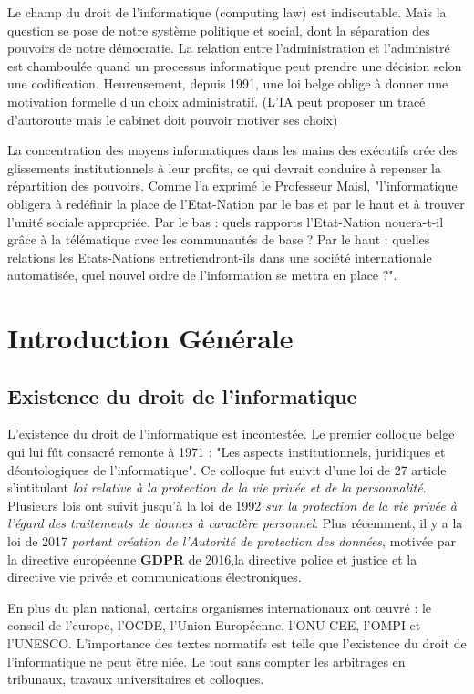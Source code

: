 \documentclass[fleqn,letterpaper, 12pt]{article}
\begin{document}
	Le champ du droit de l'informatique (computing law) est indiscutable. Mais la question se pose de notre système politique et social, dont la séparation des pouvoirs de notre démocratie. La relation entre l'administration et l'administré est chamboulée quand un processus informatique peut prendre une décision selon une codification. Heureusement, depuis 1991, une loi belge oblige à donner une motivation formelle d'un choix administratif. (L'IA peut proposer un tracé d'autoroute mais le cabinet doit pouvoir motiver ses choix)
	
	La concentration des moyens informatiques dans les mains des exécutifs crée des glissements institutionnels à leur profits, ce qui devrait conduire à repenser la répartition des pouvoirs. Comme l'a exprimé le Professeur Maisl, "l'informatique obligera à redéfinir la place de l'Etat-Nation par le bas et par le haut et à trouver l'unité sociale appropriée. Par le bas : quels rapports l'Etat-Nation nouera-t-il grâce à la télématique avec les communautés de base ? Par le haut : quelles relations les Etats-Nations entretiendront-ils dans une société internationale automatisée, quel nouvel ordre de l'information se mettra en place ?".
	
	
	\section{Introduction Générale}
	
	\subsection{Existence du droit de l'informatique}
	
	L'existence du droit de l'informatique est incontestée. Le premier colloque belge qui lui fût consacré remonte à 1971 : "Les aspects institutionnels, juridiques et déontologiques de l'informatique". Ce colloque fut suivit d'une loi de 27 article s'intitulant \emph{loi relative à la protection de la vie privée et de la personnalité}. Plusieurs lois ont suivit jusqu'à la loi de 1992 \emph{sur la protection de la vie privée à l'égard des traitements de donnes à caractère personnel}. Plus récemment, il y a la loi de 2017 \emph{portant création de l'Autorité de protection des données}, motivée par la directive européenne \textbf{GDPR} de 2016,la directive police et justice et la directive vie privée et communications électroniques.
	
	En plus du plan national, certains organismes internationaux ont \oe uvré : le conseil de l'europe, l'OCDE, l'Union Européenne, l'ONU-CEE, l'OMPI et l'UNESCO. L'importance des textes normatifs est telle que l'existence du droit de l'informatique ne peut être niée. Le tout sans compter les arbitrages en tribunaux, travaux universitaires et colloques.
	
\end{document}
